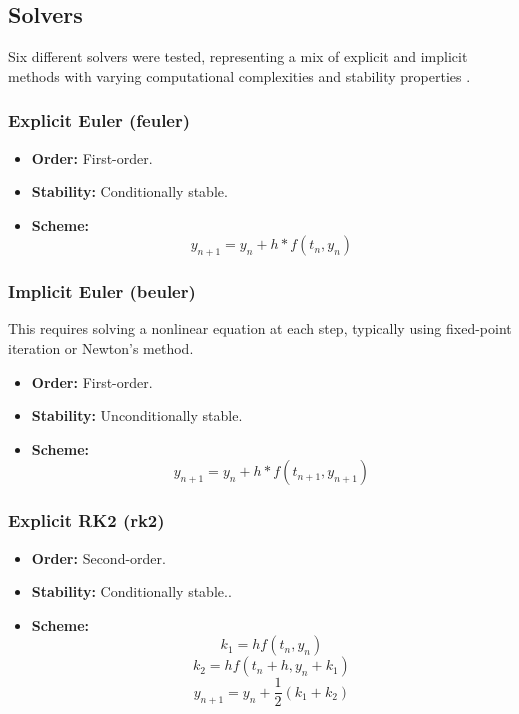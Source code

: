 \documentclass[a4paper,12pt,french]{article}
\begin{document}
\subsection{Solvers}
Six different solvers were tested, representing a mix of explicit and implicit methods with varying computational complexities and stability properties \cite{suli2010numerical}.
\subsubsection{Explicit Euler (feuler)}
\begin{itemize}
    \item \textbf{Order:} First-order.
    \item \textbf{Stability:} Conditionally stable.
    \item \textbf{Scheme:} \begin{equation}
        y_{n+1}=y_n+h*f(t_n,y_n)
    \end{equation}
\end{itemize}

\subsubsection{Implicit Euler (beuler)}
This requires solving a nonlinear equation at each step, typically using fixed-point iteration or Newton's method.
\begin{itemize}
    \item \textbf{Order:} First-order.
    \item \textbf{Stability:} Unconditionally stable.
    \item \textbf{Scheme:} \begin{equation}
        y_{n+1}=y_n+h*f(t_{n+1},y_{n+1})
    \end{equation}
\end{itemize}

\subsubsection{Explicit RK2 (rk2)}
\begin{itemize}
    \item \textbf{Order:} Second-order.
    \item \textbf{Stability:} Conditionally stable..
    \item \textbf{Scheme:} 
        \begin{equation*}
            k_1=hf(t_n,y_n)
        \end{equation*}
        \begin{equation*}
            k_2=hf(t_n+h,y_n+k_1)
        \end{equation*}
        \begin{equation}
            y_{n+1}=y_n+\frac{1}{2}(k_1+k_2)
        \end{equation}

\end{itemize}
\end{document}
